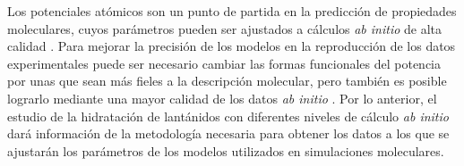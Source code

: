 Los potenciales at\'omicos son un punto de partida en la predicci\'on
de propiedades moleculares, cuyos par\'ametros pueden ser ajustados
a c\'alculos {\it ab initio} de alta calidad \citep{Sadu1999}. Para 
mejorar la precisi\'on de los modelos en la reproducci\'on de los 
datos experimentales puede ser necesario cambiar las formas 
funcionales del potencia por unas que sean m\'as fieles a la 
descripci\'on molecular, pero tambi\'en es posible lograrlo mediante
una mayor calidad de los datos {\it ab initio} \citep{Hern2005}. Por
lo anterior, el estudio de la hidrataci\'on de lant\'anidos con 
diferentes niveles de c\'alculo {\it ab initio} dar\'a informaci\'on
de la metodolog\'ia necesaria para obtener los datos a los que se
ajustar\'an los par\'ametros de los modelos utilizados en
simulaciones moleculares.
